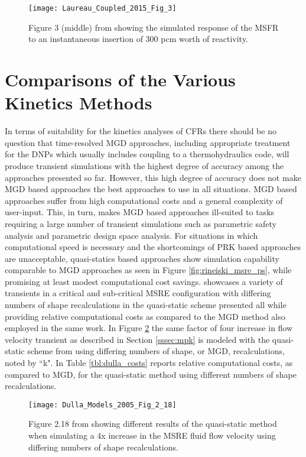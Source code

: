 \documentclass[review]{elsarticle}
\begin{document}
\begin{figure}[H]
   \centering
   \texttt{[image: Laureau\_Coupled\_2015\_Fig\_3]}
   \caption{Figure 3 (middle) from \cite{laureau_coupled_2015} showing the simulated response of
   the MSFR to an instantaneous insertion of 300 pcm worth of reactivity.} 
   \label{fig:laureau_msfr}
\end{figure}

\section{Comparisons of the Various Kinetics Methods}
\label{sec:comp}
In terms of suitability for the kinetics analyses of CFRs there should be no
question that time-resolved MGD approaches, including appropriate treatment
for the DNPs which usually includes coupling to a thermohydraulics code, will
produce transient simulations with the highest degree of accuracy among the
approaches presented so far. However, this high degree of accuracy does not
make MGD based approaches the best approaches to use in all situations.
MGD based
approaches suffer from high computational costs and a general complexity of
user-input. This, in turn, makes MGD based approaches ill-suited to tasks
requiring a large number of transient simulations such as parametric safety
analysis and parametric design space analysis.
For situations in which computational speed is necessary and the shortcomings
of PRK based approaches are unacceptable, quasi-statics based approaches
show simulation capability comparable to MGD approaches as seen in
Figure \ref{fig:rineiski_msre_ps},  while promising at
least modest computational cost savings. \cite{dulla_models_2005} showcases
a variety of transients in a critical and sub-critical MSRE configuration with
differing numbers of shape recalculations in the quasi-static scheme presented 
all while providing relative computational costs as compared to the MGD method
also employed in the same work. In Figure \ref{fig:dulla_4x_qs} the same factor
of four increase in flow velocity transient as described in Section
\ref{sssec:mpk} is modeled with the quasi-static scheme from
\cite{dulla_models_2005} using differing numbers of shape, or MGD,
recalculations, noted by ``k". In Table \ref{tbl:dulla_costs}
\cite{dulla_models_2005} reports relative computational costs, as compared to
MGD, for the quasi-static method using different numbers of shape recalculations.


\begin{figure}[H]
   \centering
   \texttt{[image: Dulla\_Models\_2005\_Fig\_2\_18]}
   \caption{Figure 2.18 from \cite{dulla_models_2005} showing different results of the
   quasi-static method when simulating a 4x increase in the MSRE fluid flow velocity using
   differing numbers of shape recalculations.} 
   \label{fig:dulla_4x_qs}
\end{figure}
\end{document}
